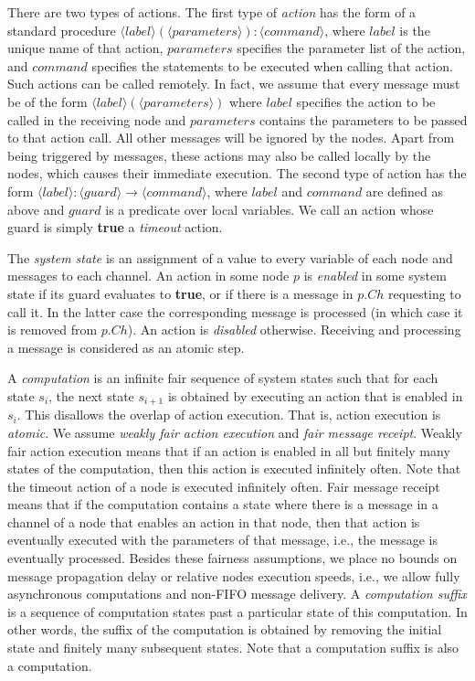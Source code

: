 \documentclass[a4paper,USenglish]{lipics}
\begin{document}
There are two types of actions. 
The first type of \emph{action} has the form of a standard procedure 
$\langle label\rangle (\langle parameters \rangle): \langle
command \rangle$, where $label$ is the unique name of that action,
$parameters$ specifies the parameter list of the action, and $command$
specifies the statements to be executed when calling that action. Such actions
can be called remotely. In fact, we assume that every message must be of the
form $\langle label \rangle (\langle parameters \rangle)$ where $label$
specifies the action to be called in the receiving node and $parameters$
contains the parameters to be passed to that action call. All other messages
will be ignored by the nodes. Apart from being triggered by messages,
these actions may also be called locally by the nodes, which causes their
immediate execution. 
The second type of action has the form $ \langle
label\rangle: \langle guard \rangle \longrightarrow \langle command \rangle$,
where $label$ and $command$ are defined as above and $guard$ is a predicate
over local variables. We call an action whose guard is simply \textbf{true} a
\emph{timeout} action.

The \emph{system state} is an assignment of a value to every variable of each node and messages to each channel. 
An action in some node $p$ is \emph{enabled} in some system state if its guard evaluates to \textbf{true}, or if there is a message in $p.Ch$ requesting to call it.
In the latter case the corresponding message is processed (in which case it is removed from $p.Ch$).
An action is \emph{disabled} otherwise. 
Receiving and processing a message is considered as an atomic step.

A \emph{computation} is an infinite fair sequence of system states such that
for each state $s_i$, the next state $s_{i+1}$ is obtained by executing an
action that is enabled in $s_i$. This disallows the overlap of action
execution. That is, action execution is \emph{atomic}. We assume \emph{weakly
fair action execution} and \emph{fair message receipt}. Weakly fair action
execution means that if an action is enabled in all but finitely many states
of the computation, then this action is executed infinitely
often. Note that the timeout action of a node is executed infinitely
often. Fair message receipt means that if the computation contains a state
where there is a message in a channel of a node that
enables an action in that node, then that action is eventually executed
with the parameters of that message, i.e., the message is eventually
processed. Besides these fairness assumptions, we place no bounds on message
propagation delay or relative nodes execution speeds, i.e., we allow fully
asynchronous computations and non-FIFO message delivery.
A \emph{computation suffix} is a sequence of computation states past a particular state of this computation. 
In other words, the suffix of the computation is obtained by removing the initial state and finitely
many subsequent states. 
Note that a computation suffix is also a computation.
\end{document}
